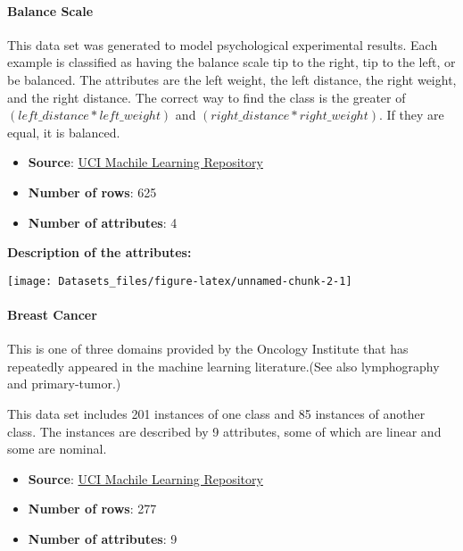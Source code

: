 \documentclass[]{article}
\providecommand{\tightlist}{%
  \setlength{\itemsep}{0pt}\setlength{\parskip}{0pt}}
\let\oldparagraph\paragraph
\renewcommand{\paragraph}[1]{\oldparagraph{#1}\mbox{}}
\begin{document}
\hypertarget{Balance-Scale}{%
\paragraph{Balance Scale}\label{Balance-Scale}}

This data set was generated to model psychological experimental results.
Each example is classified as having the balance scale tip to the right,
tip to the left, or be balanced. The attributes are the left weight, the
left distance, the right weight, and the right distance. The correct way
to find the class is the greater of \((left\_distance * left\_weight)\)
and \((right\_distance * right\_weight)\). If they are equal, it is
balanced.

\begin{itemize}
\tightlist
\item
  \textbf{Source}:
  \href{http://archive.ics.uci.edu/ml/datasets/Balance+Scale}{UCI
  Machile Learning Repository}
\item
  \textbf{Number of rows}: 625
\item
  \textbf{Number of attributes}: 4
\end{itemize}

\textbf{Description of the attributes:}

\texttt{[image: Datasets\_files/figure-latex/unnamed-chunk-2-1]}

\hypertarget{Breast-Cancer}{%
\paragraph{Breast Cancer}\label{Breast-Cancer}}

This is one of three domains provided by the Oncology Institute that has
repeatedly appeared in the machine learning literature.(See also
lymphography and primary-tumor.)

This data set includes 201 instances of one class and 85 instances of
another class. The instances are described by 9 attributes, some of
which are linear and some are nominal.

\begin{itemize}
\tightlist
\item
  \textbf{Source}:
  \href{http://archive.ics.uci.edu/ml/datasets/Breast+Cancer}{UCI
  Machile Learning Repository}
\item
  \textbf{Number of rows}: 277
\item
  \textbf{Number of attributes}: 9
\end{itemize}
\end{document}
